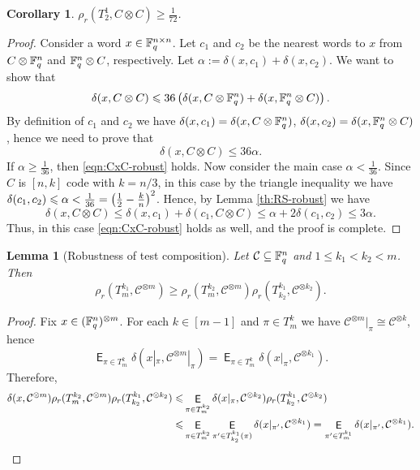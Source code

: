\documentclass[11pt]{article}
\newtheorem{corollary}{Corollary}
\newtheorem{lemma}{Lemma}
\newcommand{\cC}{\mathcal{C}}
\newcommand{\cCpow}[1]{\cC^{\otimes #1}}
\newcommand{\EE}{\mathop{\mathsf{E}}}
\begin{document}
\begin{corollary}\label{col:RS-robust}
    $\rho_r(T_2^1, C\otimes C)\ge \frac{1}{72}$.
\end{corollary}
\begin{proof}
    Consider a word $x\in \mathbb{F}_q^{n\times n}$. Let $c_1$ and $c_2$ be the nearest words to $x$ from $C\otimes \mathbb{F}_q^n$ and $\mathbb{F}_q^n\otimes C$, respectively. Let $\alpha:=\delta(x,c_1)+\delta(x,c_2)$. We want to show that 
    \begin{equation*}
        \delta(x, C\otimes C)\leqslant 36\left(\delta(x,C\otimes \mathbb{F}_q^n)+\delta(x,\mathbb{F}_q^n\otimes C)\right).
    \end{equation*}
    By definition of $c_1$ and $c_2$ we have $\delta(x,c_1)=\delta(x,C\otimes \mathbb{F}_q^n)$, $\delta(x,c_2)=\delta(x,\mathbb{F}_q^n\otimes C)$, hence we need to prove that
    \begin{equation}\label{eqn:CxC-robust}
        \delta(x,C\otimes C)\le 36 \alpha.
    \end{equation}
    If $\alpha\ge \frac{1}{36}$, then \eqref{eqn:CxC-robust} holds. Now consider the main case $\alpha<\frac{1}{36}$. Since $C$ is $[n,k]$ code with $k=n/3$, in this case by the triangle inequality
    we have $\delta(c_1,c_2)\leqslant\alpha<\frac{1}{36}=\left(\frac 12-\frac kn\right)^2$. %
    Hence, by Lemma \ref{th:RS-robust} we have 
    $$\delta(x,C\otimes C)\le \delta(x,c_1)+\delta(c_1,C\otimes C)\le \alpha+2\delta(c_1,c_2)\le 3\alpha.$$
    Thus, in this case \eqref{eqn:CxC-robust} holds as well, and the proof is complete.
\end{proof}

\newcommand{\cCn}[1]{\cC^{\widehat{(#1)}}}
\newcommand{\cCp}[1]{\cC^{(#1)}}
\newcommand{\prodC}[1][\cC]{\otimes #1}

\begin{lemma}[Robustness of test composition]\label{lemma:robust-combine}
   Let $\cC\subseteq \F_q^n$ and $1\le k_1<k_2<m$. Then
   \[\rho_r(T_m^{k_1},\cC^{\otimes m})\ge \rho_r(T_m^{k_2},\cC^{\otimes m})\rho_r(T_{k_2}^{k_1},\cC^{\otimes k_2}).\]
\end{lemma}
\begin{proof}
Fix $x\in (\mathbb{F}_q^n)^{\otimes m}$. For each $k\in[m-1]$ and $\pi\in T_m^{k}$ we have $\cCpow{m}|_\pi\cong \cCpow{k}$, hence
\[
\EE_{\pi\in T_m^{k}}\delta(x|_{\pi}, \cCpow{m}|_\pi)=\EE_{\pi\in T_m^{k}}\delta(x|_{\pi}, \cCpow{k_1}).
\]
Therefore, 
\begin{align*}
\delta(x, \cCpow{m})\rho_r(T_m^{k_2},\cCpow{m})\rho_r(T_{k_2}^{k_1},\cCpow{k_2})
\le &\EE_{\pi\in T_m^{k_2}}\delta(x|_\pi,\cCpow{k_2})\rho_r(T_{k_2}^{k_1},\cCpow{k_2})\\
\le &\EE_{\pi\in T_m^{k_2}}\EE_{\pi'\in T_{k_2}^{k_1}(\pi)}\delta(x|_{\pi'},\cCpow{k_1}) = \EE_{\pi'\in T_m^{k_1}}\delta(x|_{\pi'},\cCpow{k_1}).\qedhere
\end{align*}
\end{proof}
\end{document}
